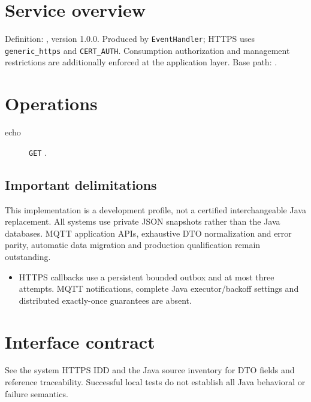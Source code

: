 \documentclass[a4paper]{arrowhead}
\begin{document}
\ArrowheadSetup
\section{Service overview}
Definition: , version 1.0.0. Produced by \texttt{EventHandler}; HTTPS uses \texttt{generic\_https} and \texttt{CERT\_AUTH}. Consumption authorization and management restrictions are additionally enforced at the application layer. Base path: .
\section{Operations}
\begin{description}
\item[echo] \texttt{GET} .
\end{description}
\subsection{Important delimitations}
This implementation is a development profile, not a certified interchangeable Java replacement. All systems use private JSON snapshots rather than the Java databases. MQTT application APIs, exhaustive DTO normalization and error parity, automatic data migration and production qualification remain outstanding.
\begin{itemize}
\item HTTPS callbacks use a persistent bounded outbox and at most three attempts. MQTT notifications, complete Java executor/backoff settings and distributed exactly-once guarantees are absent.
\end{itemize}
\section{Interface contract}
See the system HTTPS IDD and the Java source inventory for DTO fields and reference traceability. Successful local tests do not establish all Java behavioral or failure semantics.
\end{document}
